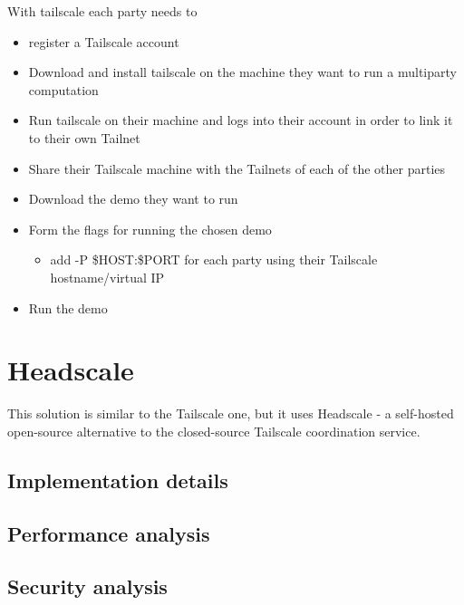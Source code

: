 With tailscale each party needs to

\begin{itemize}
\tightlist
\item
  register a Tailscale account
\item
  Download and install tailscale on the machine they want to run a
  multiparty computation
\item
  Run tailscale on their machine and logs into their account in order to
  link it to their own Tailnet
\item
  Share their Tailscale machine with the Tailnets of each of the other
  parties
\item
  Download the demo they want to run
\item
  Form the flags for running the chosen demo

  \begin{itemize}
  \tightlist
  \item
    add -P \$HOST:\$PORT for each party using their Tailscale
    hostname/virtual IP
  \end{itemize}
\item
  Run the demo
\end{itemize}

\hypertarget{headscale}{%
\chapter{Headscale}\label{headscale}}

This solution is similar to the Tailscale one, but it uses Headscale - a
self-hosted open-source alternative to the closed-source Tailscale
coordination service.

\hypertarget{implementation-details}{%
\section{Implementation details}\label{implementation-details}}

\hypertarget{performance-analysis}{%
\section{Performance analysis}\label{performance-analysis}}

\hypertarget{security-analysis}{%
\section{Security analysis}\label{security-analysis}}

